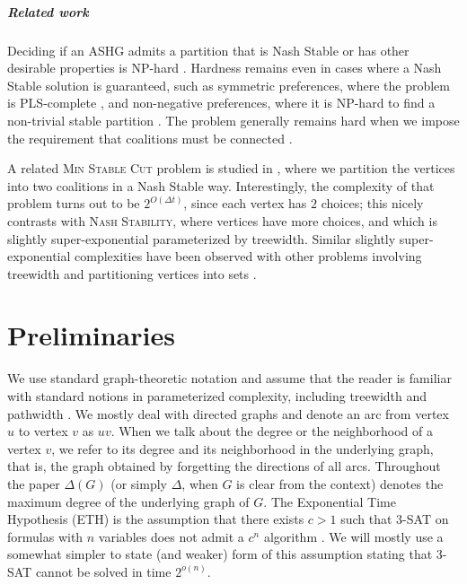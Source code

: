 \documentclass[letterpaper,USenglish,cleveref, autoref, thm-restate]{lipics-v2021}
\begin{document}
\subparagraph*{Related work} Deciding if an ASHG admits a partition that is
Nash Stable or has other desirable properties is NP-hard
\cite{AzizBS13,Ballester04,Olsen09,PetersE15,SungD10}.  Hardness remains even
in cases where a Nash Stable solution is guaranteed, such as symmetric
preferences, where the problem is PLS-complete \cite{GairingS19}, and
non-negative preferences, where it is NP-hard to find a non-trivial stable
partition \cite{OlsenBT12}. The problem generally remains hard when we impose
the requirement that coalitions must be connected \cite{BiloGM19,IgarashiE16}.

A related \textsc{Min Stable Cut} problem is studied in \cite{Lampis21}, where
we partition the vertices into two coalitions in a Nash Stable way.
Interestingly, the complexity of that problem turns out to be $2^{O(\Delta
t)}$, since each vertex has $2$ choices; this nicely contrasts with
\textsc{Nash Stability}, where vertices have more choices, and which is
slightly super-exponential parameterized by treewidth.  Similar slightly
super-exponential complexities have been observed with other problems involving
treewidth and partitioning vertices into sets
\cite{HarutyunyanLM21,LokshtanovMS18}.



\section{Preliminaries}

We use standard graph-theoretic notation and assume that the reader is familiar
with standard notions in parameterized complexity, including treewidth and
pathwidth \cite{CyganFKLMPPS15}. We mostly deal with directed graphs and denote
an arc from vertex $u$ to vertex $v$ as $uv$. When we talk about the degree or
the neighborhood of a vertex $v$, we refer to its degree and its neighborhood
in the underlying graph, that is, the graph obtained by forgetting the
directions of all arcs. Throughout the paper $\Delta(G)$ (or simply $\Delta$,
when $G$ is clear from the context) denotes the maximum degree of the
underlying graph of $G$. The Exponential Time Hypothesis (ETH) is the
assumption that there exists $c>1$ such that \textsc{3-SAT} on formulas with
$n$ variables does not admit a $c^n$ algorithm \cite{ImpagliazzoPZ01}. We will
mostly use a somewhat simpler to state (and weaker) form of this assumption
stating that \textsc{3-SAT} cannot be solved in time $2^{o(n)}$.
\end{document}
